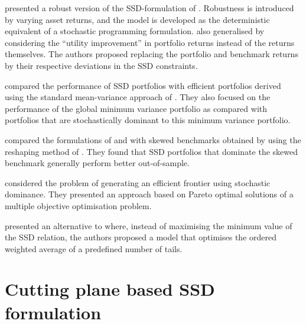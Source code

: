 \cite{sehgal2019b} presented a robust version of the SSD-formulation of \cite{dentcheva2006}. Robustness is introduced by varying asset returns, and the model is developed as the deterministic equivalent of a stochastic programming formulation. \cite{goel2021} also generalised \cite{dentcheva2006} by considering the ``utility improvement'' in portfolio returns instead of the returns themselves. The authors proposed replacing the portfolio and benchmark returns by their respective deviations in the SSD constraints.

\cite{malavasi21} compared the performance of SSD portfolios with efficient portfolios derived using the standard mean-variance approach 
of \cite{mark52}. They also focused on the performance of the global minimum variance portfolio as compared with portfolios 
that are stochastically dominant to this minimum variance portfolio.

\cite{cesarone2022} compared the formulations of \cite{roman2013} and \cite{kopa2015} with skewed benchmarks obtained by using
 the reshaping method of \cite{valle2017}. They found that SSD portfolios that dominate the skewed benchmark generally
perform better out-of-sample. 

\cite{liesio23} considered the problem of generating an efficient  frontier using stochastic dominance. They presented an approach based on Pareto optimal solutions of a multiple objective optimisation problem.

\cite{cesarone2024} presented an alternative to \cite{roman2013} where,
 instead of maximising the minimum value of the SSD relation, the authors proposed a model that optimises 
the ordered weighted average of a predefined number of tails.





\section{Cutting plane based SSD formulation}
\label{sec3}

